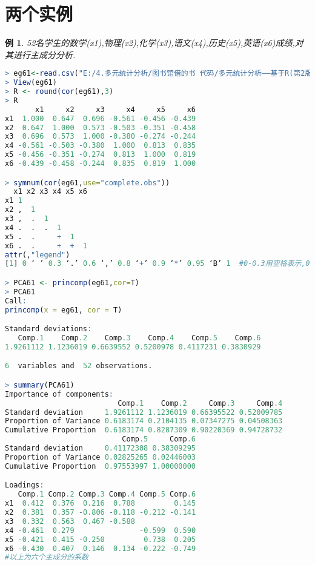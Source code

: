 \documentclass[11pt,a4paper,oneside]{book}
\newtheorem{e}{例}
\begin{document}
\section{两个实例}
\begin{e}
	52名学生的数学(x1),物理(x2),化学(x3),语文(x4),历史(x5),英语(x6)成绩,对其进行主成分分析.
\end{e}
\begin{lstlisting}[language=r]
> eg61<-read.csv("E:/4.多元统计分析/图书馆借的书 代码/多元统计分析——基于R(第2版) R-data/eg6.1.csv")
> View(eg61)
> R <- round(cor(eg61),3)
> R
       x1     x2     x3     x4     x5     x6
x1  1.000  0.647  0.696 -0.561 -0.456 -0.439
x2  0.647  1.000  0.573 -0.503 -0.351 -0.458
x3  0.696  0.573  1.000 -0.380 -0.274 -0.244
x4 -0.561 -0.503 -0.380  1.000  0.813  0.835
x5 -0.456 -0.351 -0.274  0.813  1.000  0.819
x6 -0.439 -0.458 -0.244  0.835  0.819  1.000

> symnum(cor(eg61,use="complete.obs"))
  x1 x2 x3 x4 x5 x6
x1 1                
x2 ,  1             
x3 ,  .  1          
x4 .  .  .  1       
x5 .  .     +  1    
x6 .  .     +  +  1 
attr(,"legend")
[1] 0 ‘ ’ 0.3 ‘.’ 0.6 ‘,’ 0.8 ‘+’ 0.9 ‘*’ 0.95 ‘B’ 1  #0-0.3用空格表示,0.3-0.6用句号表示,以此类推,用这种方法可快速找出相关性较强的变量.

> PCA61 <- princomp(eg61,cor=T)
> PCA61
Call:
princomp(x = eg61, cor = T)

Standard deviations:
   Comp.1    Comp.2    Comp.3    Comp.4    Comp.5    Comp.6 
1.9261112 1.1236019 0.6639552 0.5200978 0.4117231 0.3830929 

6  variables and  52 observations.

> summary(PCA61)
Importance of components:
                          Comp.1    Comp.2     Comp.3     Comp.4
Standard deviation     1.9261112 1.1236019 0.66395522 0.52009785
Proportion of Variance 0.6183174 0.2104135 0.07347275 0.04508363
Cumulative Proportion  0.6183174 0.8287309 0.90220369 0.94728732
                           Comp.5     Comp.6
Standard deviation     0.41172308 0.38309295
Proportion of Variance 0.02825265 0.02446003
Cumulative Proportion  0.97553997 1.00000000

Loadings:
   Comp.1 Comp.2 Comp.3 Comp.4 Comp.5 Comp.6
x1  0.412  0.376  0.216  0.788         0.145
x2  0.381  0.357 -0.806 -0.118 -0.212 -0.141
x3  0.332  0.563  0.467 -0.588              
x4 -0.461  0.279               -0.599  0.590
x5 -0.421  0.415 -0.250         0.738  0.205
x6 -0.430  0.407  0.146  0.134 -0.222 -0.749
#以上为六个主成分的系数


\end{lstlisting}
\end{document}
